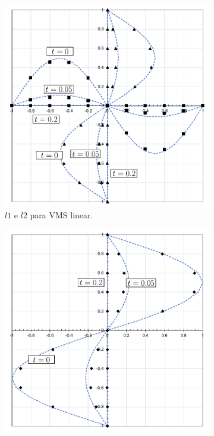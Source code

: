 \begin{figure}[h!]
    \centering
    \caption{Resultados obtidos para a simulação de TGV em:}
    \begin{subfigure}{0.42\textwidth}
        \includegraphics[width=\linewidth]{Figuras/taylor-green/VMS-Lin.pdf}
        \caption{$l1$ e $l2$ para VMS linear.}
    \end{subfigure}
    \begin{subfigure}{0.42\textwidth}
        \includegraphics[width=\linewidth]{Figuras/taylor-green/VMS-Lin-uz.pdf}

\end{subfigure}
\end{figure}
